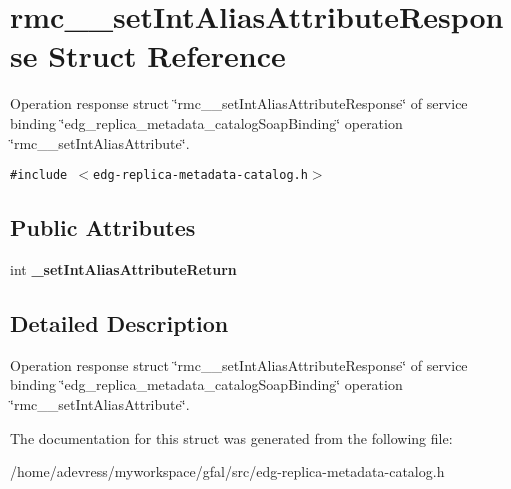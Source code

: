 \section{rmc\_\-\_\-set\-Int\-Alias\-Attribute\-Response Struct Reference}
\label{structrmc____setIntAliasAttributeResponse}
Operation response struct \char`\"{}rmc\_\-\_\-set\-Int\-Alias\-Attribute\-Response\char`\"{} of service binding \char`\"{}edg\_\-replica\_\-metadata\_\-catalog\-Soap\-Binding\char`\"{} operation \char`\"{}rmc\_\-\_\-set\-Int\-Alias\-Attribute\char`\"{}.  


{\tt \#include $<$edg-replica-metadata-catalog.h$>$}

\subsection*{Public Attributes}
\begin{CompactItemize}
\item 
int \textbf{\_\-set\-Int\-Alias\-Attribute\-Return}\label{structrmc____setIntAliasAttributeResponse_15f5523f79562c84c4639e8d05cb36cb}

\end{CompactItemize}


\subsection{Detailed Description}
Operation response struct \char`\"{}rmc\_\-\_\-set\-Int\-Alias\-Attribute\-Response\char`\"{} of service binding \char`\"{}edg\_\-replica\_\-metadata\_\-catalog\-Soap\-Binding\char`\"{} operation \char`\"{}rmc\_\-\_\-set\-Int\-Alias\-Attribute\char`\"{}. 



The documentation for this struct was generated from the following file:\begin{CompactItemize}
\item 
/home/adevress/myworkspace/gfal/src/edg-replica-metadata-catalog.h\end{CompactItemize}
